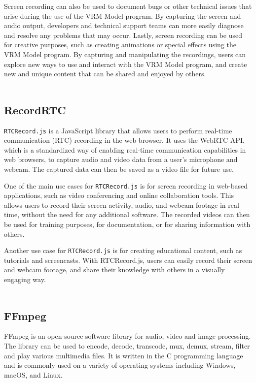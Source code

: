 Screen recording can also be used to document bugs or other technical issues that arise during the use 
of the VRM Model program. By capturing the screen and audio output, developers and technical support 
teams can more easily diagnose and resolve any problems that may occur.
Lastly, screen recording can be used for creative purposes, such as creating animations or special 
effects using the VRM Model program. By capturing and manipulating the recordings, users can explore 
new ways to use and interact with the VRM Model program, and create new and unique content that 
can be shared and enjoyed by others.
\\
\\
\subsection{RecordRTC}
\texttt{RTCRecord.js} is a JavaScript library that allows users to perform real-time communication (RTC) 
recording in the web browser. It uses the WebRTC API, which is a standardized way of enabling 
real-time communication capabilities in web browsers, to capture audio and video data from a 
user's microphone and webcam. The captured data can then be saved as a video file for future use.

One of the main use cases for \texttt{RTCRecord.js} is for screen recording in web-based applications, 
such as video conferencing and online collaboration tools. This allows users to record their 
screen activity, audio, and webcam footage in real-time, without the need for any additional 
software. The recorded videos can then be used for training purposes, for documentation, 
or for sharing information with others.

Another use case for \texttt{RTCRecord.js} is for creating educational content, such as tutorials 
and screencasts. With RTCRecord.js, users can easily record their screen and webcam footage, 
and share their knowledge with others in a visually engaging way. \cite{rtcrecord}
\\
\\
\subsection{FFmpeg}
FFmpeg is an open-source software library for audio, video and image processing. 
The library can be used to encode, decode, transcode, mux, demux, stream, filter and play various 
multimedia files. It is written in the C programming language and is commonly used on a variety of 
operating systems including Windows, macOS, and Linux.

